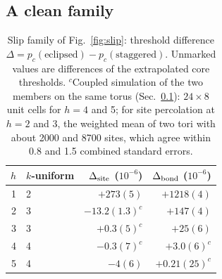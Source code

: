 \documentclass[pre,twocolumn,superscriptaddress,longbibliography,floatfix]{revtex4-2}
\newcommand{\pc}{p_c}
\begin{document}
\subsection{A clean family}\label{sec:family}

\begin{table}
\caption{Slip family of Fig.~\ref{fig:slip}: threshold difference $\Delta=\pc(\text{eclipsed})-\pc(\text{staggered})$. Unmarked values are differences of the extrapolated core thresholds. $^c$Coupled simulation of the two members on the same torus (Sec.~\ref{sec:family}): $24\times8$ unit cells for $h=4$ and 5; for site percolation at $h=2$ and 3, the weighted mean of two tori with about 2000 and 8700 sites, which agree within 0.8 and 1.5 combined standard errors.}
\label{tab:slip}
\begin{ruledtabular}
\begin{tabular}{rlrr}
$h$ & $k$-uniform & $\Delta_{\rm site}$ ($10^{-6}$) & $\Delta_{\rm bond}$ ($10^{-6}$)\\
\hline
1 & 2 & $+273(5)$ & $+1218(4)$\\
2 & 3 & $-13.2(1.3)^c$ & $+147(4)$\\
3 & 3 & $+0.3(5)^c$ & $+25(6)$\\
4 & 4 & $-0.3(7)^c$ & $+3.0(6)^c$\\
5 & 4 & $-4(6)$ & $+0.21(25)^c$\\
\end{tabular}
\end{ruledtabular}
\end{table}
\end{document}
